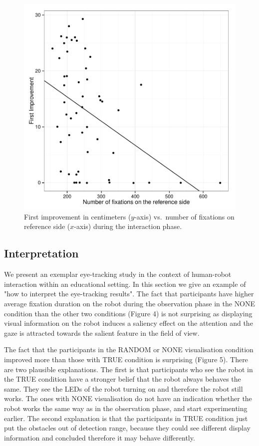 \documentclass{sig-alternate}
\begin{document}
\begin{figure}[h!]
    \centering
    \includegraphics[width=0.8\linewidth]{corPlotFirstImprove}
    \caption{First improvement in centimeters ($y$-axis) vs.~number of fixations
    on reference side ($x$-axis) during the interaction phase.}
    \label{res4}
\end{figure}


\subsection{Interpretation}

We present an exemplar eye-tracking study in the context of human-robot
interaction within an educational setting. In this section we give an example of
"how to interpret the eye-tracking results". The fact that participants have
higher average fixation duration on the robot during the observation phase in
the {\sf NONE} condition than the other two conditions (Figure 4) is not
surprising as displaying visual information on the robot induces a saliency
effect on the attention and the gaze is attracted towards the salient feature in
the field of view. 

The fact that the participants in the {\sf RANDOM} or {\sf NONE} visualisation
condition improved more than those with {\sf TRUE} condition is surprising
(Figure 5). There are two plausible explanations. The first is that participants
who see the robot in the {\sf TRUE} condition have a stronger belief that the
robot always behaves the same. They see the LEDs of the robot turning on and
therefore the robot still works. The ones with {\sf NONE} visualisation do not
have an indication whether the robot works the same way as in the observation
phase, and start experimenting earlier. The second explanation is that the
participants in {\sf TRUE} condition just put the obstacles out of detection
range, because they could see different display information and concluded
therefore it may behave differently.
\end{document}
